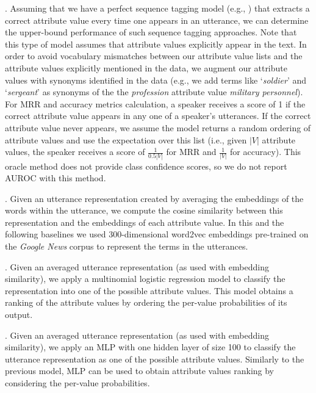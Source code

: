 .
Assuming that we have a perfect sequence tagging model (e.g., \cite{dial7}) that extracts a correct attribute value every time one appears in an utterance, we can determine the upper-bound performance of such sequence tagging approaches. Note that this type of model assumes that attribute values explicitly appear in the text.
In order to avoid vocabulary mismatches between our attribute value lists and the attribute values explicitly mentioned in the data, we augment our attribute values with synonyms identified in the data
(e.g., we add terms like `\textit{soldier}' and `\textit{sergeant}' as synonyms of the 
the \textit{profession} attribute value \textit{military personnel}).
For MRR and accuracy metrics calculation, a speaker receives a score of 1 if the correct attribute value appears in any one of a speaker's utterances. If the correct attribute value never appears, we assume the model returns a random ordering of attribute values and use the expectation over this list (i.e., given $|V|$ attribute values, the speaker receives a score of $\frac{1}{0.5|V|}$ for MRR and $\frac{1}{|V|}$ for accuracy). This oracle method does not provide class confidence scores, so we do not report AUROC with this method.

.
Given an utterance representation created by averaging the embeddings of the words within the utterance,
we compute the cosine similarity between this representation and the embeddings of each attribute value. In this and the following baselines we used 300-dimensional word2vec embeddings pre-trained on the \textit{Google News} corpus \cite{embed1} to represent the terms in the utterances. 

. 
Given an averaged utterance representation (as used with embedding similarity),
we apply a multinomial logistic regression model \cite{mccullagh2019generalized} to classify the representation into one of the possible attribute values. This model obtains a ranking of the attribute values by ordering the per-value probabilities of its output.

. Given an averaged utterance representation (as used with embedding similarity), we apply an MLP with one hidden layer of size 100 to classify the utterance representation as one of the possible attribute values. Similarly to the previous model, MLP can be used to obtain attribute values ranking by considering the per-value probabilities.


